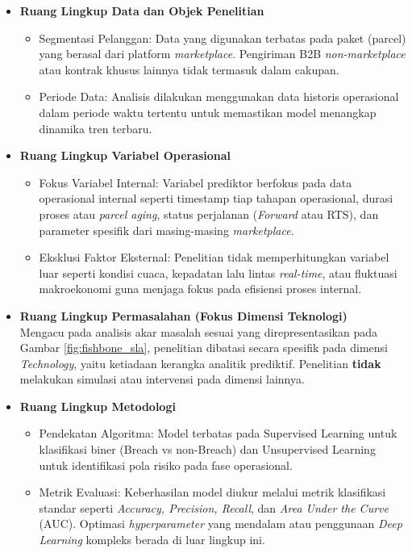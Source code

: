 \begin{itemize}
    \item \textbf{Ruang Lingkup Data dan Objek Penelitian}
        \begin{itemize}
            \item Segmentasi Pelanggan: Data yang digunakan terbatas pada paket (parcel) yang berasal dari platform \textit{marketplace}. Pengiriman B2B \textit{non-marketplace} atau kontrak khusus lainnya tidak termasuk dalam cakupan.
            \item Periode Data: Analisis dilakukan menggunakan data historis operasional dalam periode waktu tertentu untuk memastikan model menangkap dinamika tren terbaru.
        \end{itemize}
    \item \textbf{Ruang Lingkup Variabel Operasional}
        \begin{itemize}
            \item Fokus Variabel Internal: Variabel prediktor berfokus pada data operasional internal seperti timestamp tiap tahapan operasional, durasi proses atau \textit{parcel aging}, status perjalanan (\textit{Forward} atau RTS), dan parameter spesifik dari masing-masing \textit{marketplace}.
            \item Eksklusi Faktor Eksternal: Penelitian tidak memperhitungkan variabel luar seperti kondisi cuaca, kepadatan lalu lintas \textit{real-time}, atau fluktuasi makroekonomi guna menjaga fokus pada efisiensi proses internal.
        \end{itemize}
    \item \textbf{Ruang Lingkup Permasalahan (Fokus Dimensi Teknologi)}\\Mengacu pada analisis akar masalah sesuai yang direpresentasikan pada Gambar \ref{fig:fishbone_sla}, penelitian dibatasi secara spesifik pada dimensi \textit{Technology}, yaitu ketiadaan kerangka analitik prediktif. Penelitian \textbf{tidak} melakukan simulasi atau intervensi pada dimensi lainnya.
    \item \textbf{Ruang Lingkup Metodologi}
        \begin{itemize}
            \item Pendekatan Algoritma: Model terbatas pada Supervised Learning untuk klasifikasi biner (Breach vs non-Breach) dan Unsupervised Learning untuk identifikasi pola risiko pada fase operasional.
            \item Metrik Evaluasi: Keberhasilan model diukur melalui metrik klasifikasi standar seperti \textit{Accuracy, Precision, Recall}, dan \textit{Area Under the Curve} (AUC). Optimasi \textit{hyperparameter} yang mendalam atau penggunaan \textit{Deep Learning }kompleks berada di luar lingkup ini.

\end{itemize}
\end{itemize}
